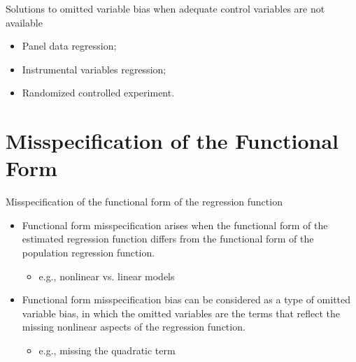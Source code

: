 \documentclass[presentation,10pt]{beamer}
\begin{document}
\begin{frame}[label={sec:org567de93}]{Solutions to omitted variable bias when adequate control variables are not available}
\begin{itemize}
\item Panel data regression;
\item Instrumental variables regression;
\item Randomized controlled experiment.
\end{itemize}
\end{frame}

\section{Misspecification of the Functional Form}
\label{sec:orgd5dd68e}

\begin{frame}[label={sec:org1a93d5e}]{Misspecification of the functional form of the regression function}
\begin{itemize}
\item Functional form misspecification arises when the functional form of
the estimated regression function differs from the functional form of
the population regression function. 
\begin{itemize}
\item e.g., nonlinear vs. linear models
\end{itemize}
\end{itemize}

\vspace{0.1cm}

\begin{itemize}
\item Functional form misspecification bias can be considered as a type of
omitted variable bias, in which the omitted variables are the terms
that reflect the missing nonlinear aspects of the regression
function. 
\begin{itemize}
\item e.g., missing the quadratic term
\end{itemize}
\end{itemize}
\end{frame}
\end{document}
